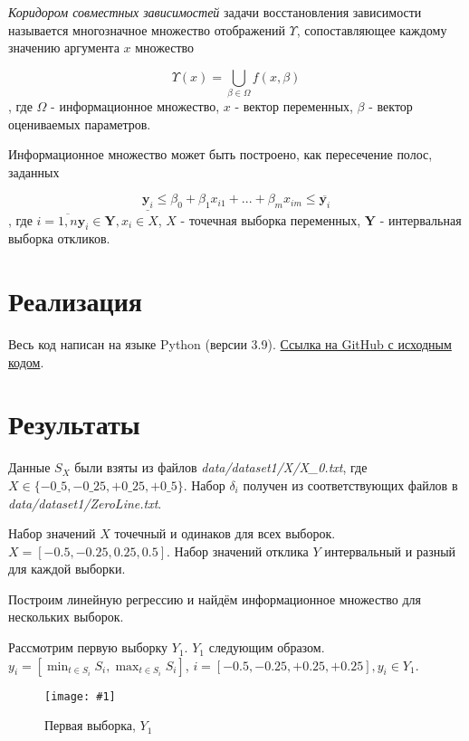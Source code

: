 \documentclass[a4paper,12pt]{article}
\newcommand{\plot}[3]{
    \begin{figure}[H]
        \begin{center}
            \texttt{[image: \#1]}
            \caption{#2}
            \label{#3}
        \end{center}
    \end{figure}
}
\begin{document}
    \textsl{Коридором совместных зависимостей} задачи восстановления зависимости
    называется многозначное множество отображений $ \Upsilon $, сопоставляющее
    каждому значению аргумента $ x $ множество
    
    \begin{equation}
        \Upsilon(x) = \bigcup_{\beta \in \Omega} f(x, \beta)
    \end{equation}
    , где $ \Omega $ - информационное множество, $ x $ - вектор переменных, $ \beta $ - вектор оцениваемых параметров. 

    Информационное множество может быть построено, как пересечение полос, заданных
    
    \begin{equation}
        \underline{\textbf{y}_i} \leq \beta_0 + \beta_1 x_{i1} + ... + \beta_m x_{im} \leq \overline{\textbf{y}_i}
    \end{equation}
    , где $ i = \overline{1, n} \textbf{y}_i \in \textbf{Y}, x_i \in X $, $ X $ - точечная выборка переменных,
    $ \textbf{Y} $ - интервальная выборка откликов.

    \section{Реализация}
    \quad Весь код написан на языке Python (версии 3.9).
    \href{https://github.com/gobdr/interval_data_analysis/tree/master/lab2}{Ссылка на GitHub с исходным кодом}.

    \section{Результаты}
    \quad Данные $ S_X $ были взяты из файлов \textsl{data/dataset1/X/X\_0.txt}, \newline
    где $ X \in \{-0\_5, -0\_25, +0\_25, +0\_5 \} $.
    Набор $ \delta_i $ получен из соответствующих файлов в \textsl{data/dataset1/ZeroLine.txt}.

    Набор значений $ X $ точечный и одинаков для всех выборок. \newline
    $ X = [-0.5, -0.25, 0.25, 0.5]  $.
    Набор значений отклика $ Y $ интервальный и разный для каждой выборки.
    
    Построим линейную регрессию и найдём информационное множество для нескольких выборок.

    Рассмотрим первую выборку $ Y_1 $.
    $ Y_1 $ следующим образом. $ y_i = [\min_{t \in S_i}{S_i}, \max_{t \in S_i}{S_i}]$,
    $ i = [-0.5, -0.25, +0.25, +0.25], y_i \in Y_1 $.
    \plot{Y1}{Первая выборка, $ Y_1 $}{p:sampleY1}
\end{document}
